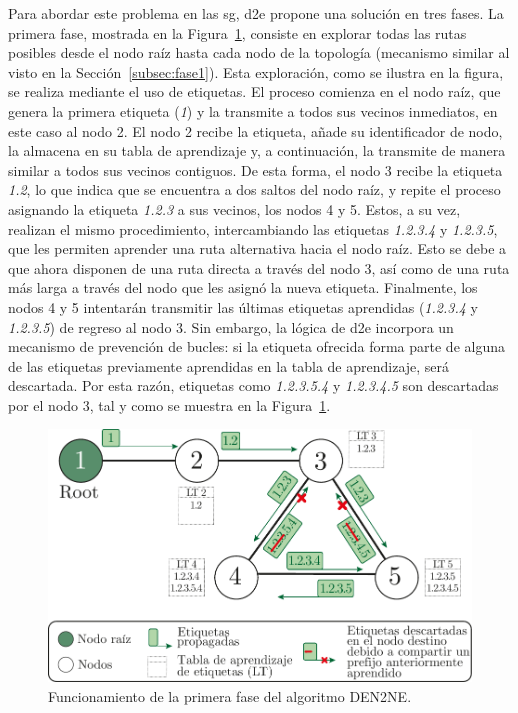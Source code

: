 Para abordar este problema en las \gls{sg}, \gls{d2e} propone una solución en tres fases. La primera fase, mostrada en la Figura~\ref{fig:labelspropagation}, consiste en explorar todas las rutas posibles desde el nodo raíz hasta cada nodo de la topología (mecanismo similar al visto en la Sección~\ref{subsec:fase1}). Esta exploración, como se ilustra en la figura, se realiza mediante el uso de etiquetas. El proceso comienza en el nodo raíz, que genera la primera etiqueta (\textit{1}) y la transmite a todos sus vecinos inmediatos, en este caso al nodo 2. El nodo 2 recibe la etiqueta, añade su identificador de nodo, la almacena en su tabla de aprendizaje y, a continuación, la transmite de manera similar a todos sus vecinos contiguos. De esta forma, el nodo 3 recibe la etiqueta \textit{1.2}, lo que indica que se encuentra a dos saltos del nodo raíz, y repite el proceso asignando la etiqueta \textit{1.2.3} a sus vecinos, los nodos 4 y 5. Estos, a su vez, realizan el mismo procedimiento, intercambiando las etiquetas \textit{1.2.3.4} y \textit{1.2.3.5}, que les permiten aprender una ruta alternativa hacia el nodo raíz. Esto se debe a que ahora disponen de una ruta directa a través del nodo 3, así como de una ruta más larga a través del nodo que les asignó la nueva etiqueta. Finalmente, los nodos 4 y 5 intentarán transmitir las últimas etiquetas aprendidas (\textit{1.2.3.4} y \textit{1.2.3.5}) de regreso al nodo 3. Sin embargo, la lógica de \gls{d2e} incorpora un mecanismo de prevención de bucles: si la etiqueta ofrecida forma parte de alguna de las etiquetas previamente aprendidas en la tabla de aprendizaje, será descartada. Por esta razón, etiquetas como \textit{1.2.3.5.4} y \textit{1.2.3.4.5} son descartadas por el nodo 3, tal y como se muestra en la Figura~\ref{fig:labelspropagation}.
 

\begin{figure}[H]
    \centering
    \includegraphics[width=0.6\linewidth]{fig/06_fault_sg/fault_sg_07.pdf}
    \caption{Funcionamiento de la primera fase del algoritmo DEN2NE.}
    \label{fig:labelspropagation}
\end{figure}


